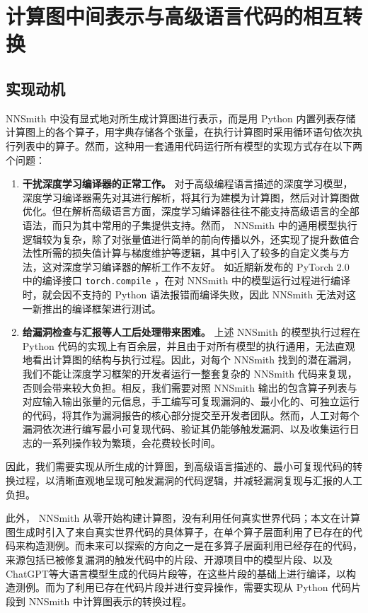 
\chapter{计算图中间表示与高级语言代码的相互转换}
\label{chp:eng}

\section{实现动机}

NNSmith 中没有显式地对所生成计算图进行表示，而是用 Python 内置列表存储计算图上的各个算子，用字典存储各个张量，在执行计算图时采用循环语句依次执行列表中的算子。然而，这种用一套通用代码运行所有模型的实现方式存在以下两个问题：
\begin{enumerate}
    \item \textbf{干扰深度学习编译器的正常工作。} 对于高级编程语言描述的深度学习模型，深度学习编译器需先对其进行解析，将其行为建模为计算图，然后对计算图做优化。但在解析高级语言方面，深度学习编译器往往不能支持高级语言的全部语法，而只为其中常用的子集提供支持。然而， NNSmith 中的通用模型执行逻辑较为复杂，除了对张量值进行简单的前向传播以外，还实现了提升数值合法性所需的损失值计算与梯度维护等逻辑，其中引入了较多的自定义类与方法，这对深度学习编译器的解析工作不友好。
    如近期新发布的 PyTorch 2.0 \cite{pt2_release} 中的编译接口 \texttt{torch.compile} ，在对 NNSmith 中的模型运行过程进行编译时，就会因不支持的 Python 语法报错而编译失败，因此 NNSmith 无法对这一新推出的编译框架进行测试。
    \item \textbf{给漏洞检查与汇报等人工后处理带来困难。} 上述 NNSmith 的模型执行过程在 Python 代码的实现上有百余层，并且由于对所有模型的执行通用，无法直观地看出计算图的结构与执行过程。因此，对每个 NNSmith 找到的潜在漏洞，我们不能让深度学习框架的开发者运行一整套复杂的 NNSmith 代码来复现，否则会带来较大负担。相反，我们需要对照 NNSmith 输出的包含算子列表与对应输入输出张量的元信息，手工编写可复现漏洞的、最小化的、可独立运行的代码，将其作为漏洞报告的核心部分提交至开发者团队。然而，人工对每个漏洞依次进行编写最小可复现代码、验证其仍能够触发漏洞、以及收集运行日志的一系列操作较为繁琐，会花费较长时间。
\end{enumerate}
因此，我们需要实现从所生成的计算图，到高级语言描述的、最小可复现代码的转换过程，以清晰直观地呈现可触发漏洞的代码逻辑，并减轻漏洞复现与汇报的人工负担。

此外， NNSmith 从零开始构建计算图，没有利用任何真实世界代码；本文在计算图生成时引入了来自真实世界代码的具体算子，在单个算子层面利用了已存在的代码来构造测例。而未来可以探索的方向之一是在多算子层面利用已经存在的代码，来源包括已被修复漏洞的触发代码中的片段、开源项目中的模型片段、以及 ChatGPT\cite{chatgpt}等大语言模型生成的代码片段等，在这些片段的基础上进行编译，以构造测例。而为了利用已存在代码片段并进行变异操作，需要实现从 Python 代码片段到 NNSmith 中计算图表示的转换过程。

